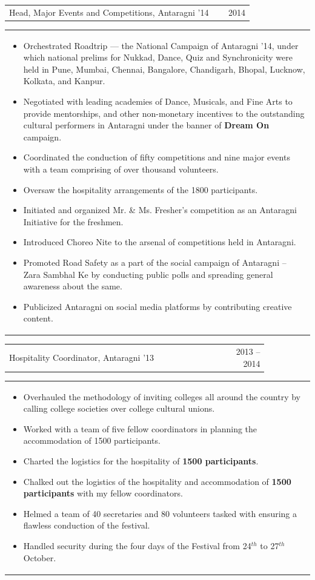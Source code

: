 \documentclass[a4paper,10pt]{article} %
\newcommand{\iproject}[3]{
    \begin{tabular}{p{0.85\linewidth}r}
        \textcolor{NavyBlue}{#2} & \multicolumn{1}{m{3cm}}{\raggedleft \textsc{#1}}\\
    \end{tabular}
    \begin{tabular}{p{\linewidth}}
    \vspace{-0.3cm}
        \footnotesize{#3}
    \end{tabular}
    \vspace{-0.5cm}
}
\begin{document}
\iproject {2014}
          {Head, Major Events and Competitions, Antaragni '14}
          {
               \begin{itemize}[leftmargin=0.5cm]
                    \item Orchestrated Roadtrip --- the National Campaign of Antaragni '14, under which national prelims for Nukkad,
                        Dance, Quiz and Synchronicity were held in Pune, Mumbai, Chennai, Bangalore, Chandigarh, Bhopal, Lucknow,
                        Kolkata, and Kanpur.
                    \item Negotiated with leading academies of Dance, Musicals, and Fine Arts to provide mentorships, and other
                        non-monetary incentives to the outstanding cultural performers in Antaragni under the banner
                        of \textbf{Dream On} campaign.
                    \item Coordinated the conduction of fifty competitions and nine major events with a team comprising of over
                        thousand volunteers.
                    \item Oversaw the hospitality arrangements of the 1800 participants.
                    \item Initiated and organized Mr. \& Ms. Fresher's competition as an Antaragni Initiative for the freshmen.
                    \item Introduced Choreo Nite to the arsenal of competitions held in Antaragni.
                    \item Promoted Road Safety as a part of the social campaign of Antaragni -- Zara Sambhal Ke by conducting
                        public polls and spreading general awareness about the same.
                    \item Publicized Antaragni on social media platforms by contributing creative content.
               \end{itemize}
          }

\iproject {2013 -- 2014}
          {Hospitality Coordinator, Antaragni '13}
          {
               \begin{itemize}[leftmargin=0.5cm]
                   \item Overhauled the methodology of inviting colleges all around the country by calling college societies over college cultural unions.
                   \item Worked with a team of five fellow coordinators in planning the accommodation of 1500 participants.
                   \item Charted the logistics for the hospitality of \textbf{1500 participants}.
                   \item Chalked out the logistics of the hospitality and accommodation of \textbf{1500 participants} with my fellow coordinators.
                   \item Helmed a team of 40 secretaries and 80 volunteers tasked with ensuring a flawless conduction of the festival.
                   \item Handled security during the four days of the Festival from 24$^{th}$ to 27$^{th}$ October.
               \end{itemize}
          }
\end{document}
